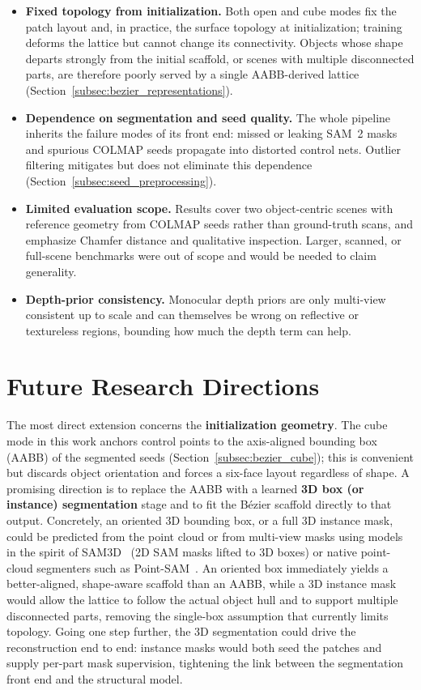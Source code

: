 \documentclass{report}
\begin{document}
\begin{itemize}
    \item \textbf{Fixed topology from initialization.} Both open and cube modes fix the patch layout and, in practice, the surface topology at initialization; training deforms the lattice but cannot change its connectivity. Objects whose shape departs strongly from the initial scaffold, or scenes with multiple disconnected parts, are therefore poorly served by a single AABB-derived lattice (Section~\ref{subsec:bezier_representations}).
    \item \textbf{Dependence on segmentation and seed quality.} The whole pipeline inherits the failure modes of its front end: missed or leaking SAM~2 masks and spurious COLMAP seeds propagate into distorted control nets. Outlier filtering mitigates but does not eliminate this dependence (Section~\ref{subsec:seed_preprocessing}).
    \item \textbf{Limited evaluation scope.} Results cover two object-centric scenes with reference geometry from COLMAP seeds rather than ground-truth scans, and emphasize Chamfer distance and qualitative inspection. Larger, scanned, or full-scene benchmarks were out of scope and would be needed to claim generality.
    \item \textbf{Depth-prior consistency.} Monocular depth priors are only multi-view consistent up to scale and can themselves be wrong on reflective or textureless regions, bounding how much the depth term can help.
\end{itemize}

\section{Future Research Directions}

The most direct extension concerns the \textbf{initialization geometry}. The cube mode in this work anchors control points to the axis-aligned bounding box (AABB) of the segmented seeds (Section~\ref{subsec:bezier_cube}); this is convenient but discards object orientation and forces a six-face layout regardless of shape. A promising direction is to replace the AABB with a learned \textbf{3D box (or instance) segmentation} stage and to fit the B\'ezier scaffold directly to that output. Concretely, an oriented 3D bounding box, or a full 3D instance mask, could be predicted from the point cloud or from multi-view masks using models in the spirit of SAM3D~\cite{zhang2023sam3d} (2D SAM masks lifted to 3D boxes) or native point-cloud segmenters such as Point-SAM~\cite{zhou2025pointsam}. An oriented box immediately yields a better-aligned, shape-aware scaffold than an AABB, while a 3D instance mask would allow the lattice to follow the actual object hull and to support multiple disconnected parts, removing the single-box assumption that currently limits topology. Going one step further, the 3D segmentation could drive the reconstruction end to end: instance masks would both seed the patches and supply per-part mask supervision, tightening the link between the segmentation front end and the structural model.
\end{document}
